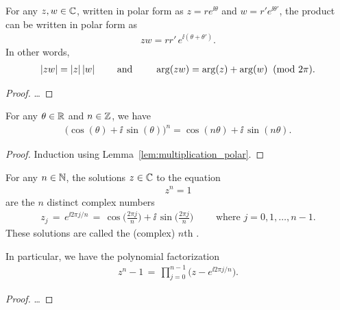 \begin{lemma}
  \label{lem:multiplication_polar}
  For any $z,w \in \mathbb{C}$, written in polar form as
  $z = r e^{\ii \theta}$ and $w = r' e^{\ii \theta'}$, the product
  can be written in polar form as
  \begin{align*}
    z w = r r' \, e^{\ii (\theta + \theta')} .
  \end{align*}
  In other words,
  \begin{align*}
    |z w| = |z| \, |w|
    \qquad \text{ and } \qquad
    \arg(z w) = \arg(z) + \arg(w) \;\;(\mathrm{mod}~2\pi).
  \end{align*}
\end{lemma}
\begin{proof}
  \ldots
\end{proof}

\begin{theorem}
  \label{lem:de_moivre}
  For any $\theta \in \mathbb{R}$ and $n \in \mathbb{Z}$, we have
  \begin{align*}
    \big( \cos (\theta) + \ii \, \sin (\theta) \big)^n = \cos(n \theta) + \ii \, \sin(n \theta) .
  \end{align*}
\end{theorem}
\begin{proof}
  Induction using Lemma~\ref{lem:multiplication_polar}.
\end{proof}

\begin{lemma}
  \label{lem:roots_of_unity}
  For any $n \in \mathbb{N}$, the solutions $z \in \mathbb{C}$ to the equation
  \begin{align*}
    z^n = 1
  \end{align*}
  are the $n$ distinct complex numbers
  \begin{align*}
    z_j \, = \, e^{\ii 2 \pi j / n}
        \, = \, \cos \Big( \frac{2 \pi j}{n} \Big) + \ii \, \sin \Big( \frac{2 \pi j}{n} \Big)
    \qquad \text{ where } j = 0, 1, \ldots, n-1 .
  \end{align*}
  These solutions are called the (complex) $n$th .

  In particular, we have the polynomial factorization
  \begin{align*}
    z^n - 1 \, = \, \prod_{j=0}^{n-1} \Big( z - e^{\ii 2 \pi j / n} \Big) .
  \end{align*}
\end{lemma}
\begin{proof}
  \ldots
\end{proof}

